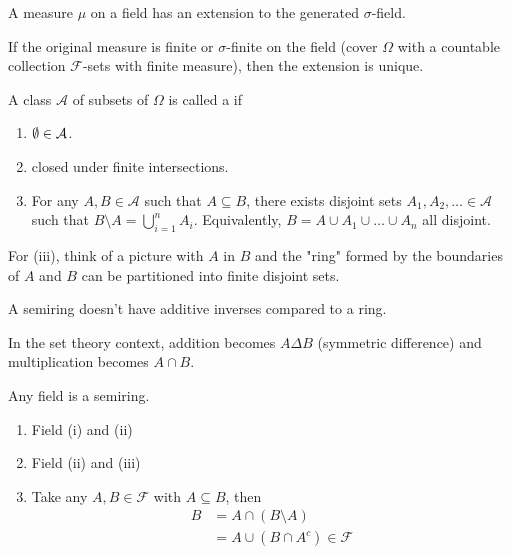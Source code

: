 \documentclass[class=article,crop=false]{standalone}
\begin{document}
\begin{thm}[11.2]
	A measure $ \mu$ on a field has an extension to the generated $\sigma$-field.
\end{thm}

\begin{claim}[]
	If the original measure is finite or $ \sigma$-finite on the field (cover $ \Omega$ with a countable collection $ \mathcal{F}$-sets with finite measure), then the extension is unique.
\end{claim}

\begin{defn}[semiring]
A class $ \mathcal{A}$ of subsets of $ \Omega$ is called a  if
\begin{enumerate}[label=(\roman*)]
	\item $ \emptyset \in \mathcal{A}$.
	\item closed under finite intersections.
	\item For any  $ A,B \in \mathcal{A}$ such that $ A \subseteq B$, there exists disjoint sets $ A_1,A_2,\ldots \in \mathcal{A}$ such that $ B \setminus A = \bigcup_{ i= 1}^{ n} A_i$. Equivalently, $ B = A \cup A_1 \cup  \ldots \cup A_n$ all disjoint.
\end{enumerate}
\end{defn}
\begin{note}[]
	For (iii), think of a picture with $ A$ in  $ B$ and the "ring" formed by the boundaries of  $ A$ and  $ B$ can be partitioned into finite disjoint sets.

A semiring doesn't have additive inverses compared to a ring.

In the set theory context, addition becomes $ A \Delta B$ (symmetric difference) and multiplication becomes $ A \cap B $.
\end{note}

\begin{eg}[]
	Any field is a semiring. 
	\begin{enumerate}[label=(\roman*)]
		\item Field (i) and (ii) 
		\item Field (ii) and (iii) 
		\item Take any $ A,B \in \mathcal{F}$ with $ A \subseteq B$, then
			\begin{align*}
				B &= A \cap  (B\setminus A) \\
				  &= A \cup (B \cap A^{c}) \in \mathcal{F} 
			\end{align*}
	\end{enumerate}
\end{eg}
\end{document}
